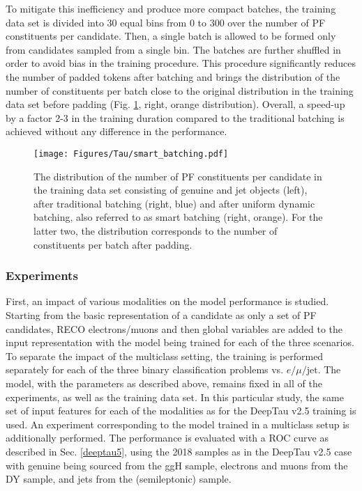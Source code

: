 To mitigate this inefficiency and produce more compact batches, the training data set is divided into 30 equal bins from 0 to 300 over the number of PF constituents per \tauh candidate. Then, a single batch is allowed to be formed only from \tauh candidates sampled from a single bin. The batches are further shuffled in order to avoid bias in the training procedure. This procedure significantly reduces the number of padded tokens after batching and brings the distribution of the number of constituents per batch close to the original distribution in the training data set before padding (Fig. \ref{fig:smart_batching}, right, orange distribution). Overall, a speed-up by a factor 2-3 in the training duration compared to the traditional batching is achieved without any difference in the performance. 
\begin{figure}[!t]
    \centering
    \texttt{[image: Figures/Tau/smart\_batching.pdf]}
    \caption{The distribution of the number of PF constituents per \tauh candidate in the training data set consisting of genuine \tauh and jet objects (left), after traditional batching (right, blue) and after uniform dynamic batching, also referred to as smart batching (right, orange). For the latter two, the distribution corresponds to the number of constituents per batch after padding.}
    \label{fig:smart_batching}
\end{figure}

\subsubsection{Experiments}

First, an impact of various modalities on the model performance is studied. Starting from the basic representation of a \tauh candidate as only a set of PF candidates, RECO electrons/muons and then global variables are added to the input representation with the model being trained for each of the three scenarios. To separate the impact of the multiclass setting, the training is performed separately for each of the three binary classification problems \tauh vs. $e/\mu/\text{jet}$. The model, with the parameters as described above, remains fixed in all of the experiments, as well as the training data set. In this particular study, the same set of input features for each of the modalities as for the DeepTau v2.5 training is used. An experiment corresponding to the model trained in a multiclass setup is additionally performed. The performance is evaluated with a ROC curve as described in Sec. \ref{deeptau5}, using the 2018 samples as in the DeepTau v2.5 case with genuine \tauh being sourced from the ggH sample, electrons and muons from the DY sample, and jets from the \ttbar (semileptonic) sample. 

